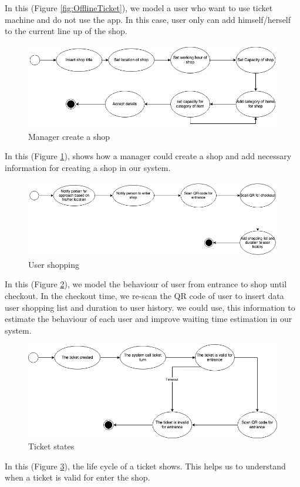 In this (Figure \ref{fig:OfflineTicket}), we model a user who want to use ticket machine and do not use the app. In this case, user only can add himself/herself to the current line up of the shop.

\begin{figure}[H]
  \includegraphics[width=\textwidth,height=\textheight,keepaspectratio]{images/CreateShop.png}
  \caption{Manager create a shop}
  \label{fig:CreateShop}
\end{figure}

In this (Figure \ref{fig:CreateShop}), shows how a manager could create a shop and add necessary information for creating a shop in our system.

\begin{figure}[H]
  \includegraphics[width=\textwidth,height=\textheight,keepaspectratio]{images/Shopping.png}
  \caption{User shopping}
  \label{fig:shopping}
\end{figure}

In this (Figure \ref{fig:shopping}), we model the behaviour of user from entrance to shop until checkout. In the checkout time, we re-scan the QR code of user to insert data user shopping list and duration to user history. we could use, this information to estimate the behaviour of each user and improve waiting time estimation in our system.

\begin{figure}[H]
  \includegraphics[width=\textwidth,height=\textheight,keepaspectratio]{images/Ticket.png}
  \caption{Ticket states}
  \label{fig:ticket}
\end{figure}

In this (Figure \ref{fig:ticket}), the life cycle of a ticket shows. This helps us to understand when a ticket is valid for enter the shop.